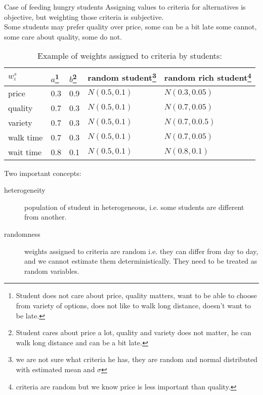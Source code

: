 \documentclass{beamer}
\newcommand\male{\fontsize{8}{7.2}\selectfont}
\begin{document}
\begin{frame}{Case of feeding hungry students}
\male
Assigning values to criteria for alternatives is objective, but weighting those criteria is \alert{subjective}.\\ Some students may prefer quality over price, some can be a bit late some cannot, some care about quality, some do not.
\begin{table}[]
\centering
\caption{\male Example of weights assigned to criteria by students:}
\label{my-label}
\begin{tabular}{l|l|l|l|l}
$w_i^s$ &  $a$\footnote{\tiny Student does not care about price, quality matters, want to be able to choose from variety of options, does not like to walk long distance, doesn't want to be late.} & $b$\footnote{\tiny Student cares about price a lot, quality and variety does not matter, he can walk long distance and can be a bit late.} & random student\footnote{\tiny we are not sure what criteria he has, they are random and normal distributed with estimated mean and $\sigma$} & random rich student\footnote{\tiny criteria are random but we know price is less important than quality.}   \\ \hline
price & 0.3 & 0.9 & $N(0.5,0.1)$ & $N(0.3,0.05)$  \\
quality & 0.7 & 0.3 & $N(0.5,0.1)$  & $N(0.7,0.05)$  \\
variety & 0.7 & 0.3 & $N(0.5,0.1)$ &  $N(0.7,0.0.5)$ \\
walk time & 0.7 & 0.3 & $N(0.5,0.1)$ & $N(0.7,0.05)$  \\
wait time & 0.8 & 0.1 & $N(0.5,0.1)$ & $N(0.8,0.1)$ \\ \hline
\end{tabular}
\end{table}
Two important concepts:
\begin{description}
\item[heterogeneity] population of student in heterogeneous, i.e. some students are different from another.
\item[randomness] weights assigned to criteria are random i.e. they can differ from day to day, and we cannot estimate them deterministically. They need to be treated as \alert{random variables}.
\end{description}
\end{frame}
\end{document}
